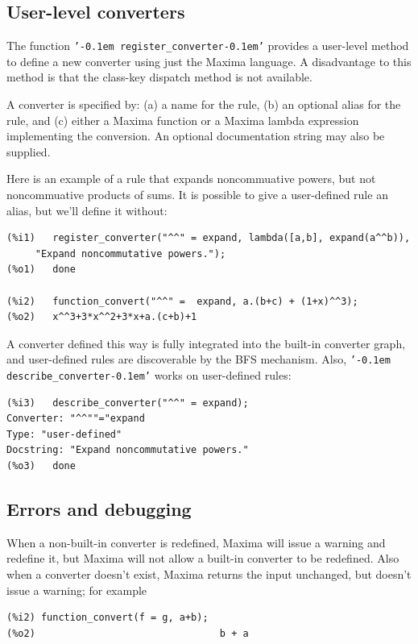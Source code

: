 \documentclass[12pt,fleqn]{extarticle}
\newcommand{\ttq}[1]{\texttt{'\kern-0.1em #1\kern-0.1em'}}
\newenvironment{maximabox}
  {\begin{tcolorbox}[
      breakable,
      enhanced,
      colback=white,
      colframe=black!8,
      boxrule=0pt,
      borderline west={2.2pt}{0pt}{black!25},
      arc=1pt,
      left=11pt,
      right=7pt,
      top=9pt,
      bottom=9pt,
      before skip=14pt,
      after skip=14pt
    ]}
  {\end{tcolorbox}}
\begin{document}
\subsection{User-level converters}
\label{sec:register-converter}

The function \ttq{register\_converter} provides a user-level method to define a new converter using just the Maxima language.  A disadvantage to this method is that the class-key dispatch method is 
not available. 

A converter is specified by: (a) a name for the rule,  (b) an optional alias for the rule, and (c) either
a Maxima function or a Maxima lambda expression implementing the conversion.  An optional documentation string may also be supplied.

Here is an example of a rule that expands noncommuative powers, but not noncommuative products
of sums. It is possible to give a user-defined rule an alias, but we'll define it without:
\begin{maximabox}
\begin{verbatim}
(%i1)	register_converter("^^" = expand, lambda([a,b], expand(a^^b)), 
     "Expand noncommutative powers.");
(%o1)	done

(%i2)	function_convert("^^" =  expand, a.(b+c) + (1+x)^^3);
(%o2)	x^^3+3*x^^2+3*x+a.(c+b)+1
\end{verbatim}
\end{maximabox}
\noindent A converter defined this way is fully integrated into the built-in converter graph, and user-defined rules are discoverable by the BFS mechanism.  Also, \ttq{describe\_converter} works on 
user-defined rules:
\begin{maximabox}
\begin{verbatim}
(%i3)	describe_converter("^^" = expand);
Converter: "^^""="expand
Type: "user-defined"
Docstring: "Expand noncommutative powers."
(%o3)	done
\end{verbatim}
\end{maximabox}

\subsection{Errors and debugging}

When a non-built-in converter is redefined, Maxima will issue a warning and redefine it, but
Maxima will not allow a built-in converter to be redefined.  Also when a converter
doesn't exist,  Maxima returns the input unchanged, but doesn't issue a warning; 
for example
\begin{maximabox}
\begin{verbatim}
(%i2) function_convert(f = g, a+b);
(%o2)                                b + a
\end{verbatim}
\end{maximabox}
\end{document}
